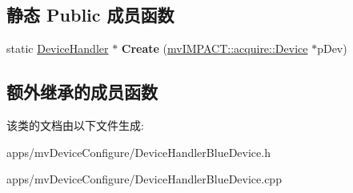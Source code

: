 \subsection*{静态 Public 成员函数}
\begin{DoxyCompactItemize}
\item 
\hypertarget{class_device_handler_blue_device_af8d1be895764bb0ef4ff4ec09198c07b}{static \hyperlink{class_device_handler}{Device\+Handler} $\ast$ {\bfseries Create} (\hyperlink{classmv_i_m_p_a_c_t_1_1acquire_1_1_device}{mv\+I\+M\+P\+A\+C\+T\+::acquire\+::\+Device} $\ast$p\+Dev)}\label{class_device_handler_blue_device_af8d1be895764bb0ef4ff4ec09198c07b}

\end{DoxyCompactItemize}
\subsection*{额外继承的成员函数}


该类的文档由以下文件生成\+:\begin{DoxyCompactItemize}
\item 
apps/mv\+Device\+Configure/Device\+Handler\+Blue\+Device.\+h\item 
apps/mv\+Device\+Configure/Device\+Handler\+Blue\+Device.\+cpp\end{DoxyCompactItemize}
